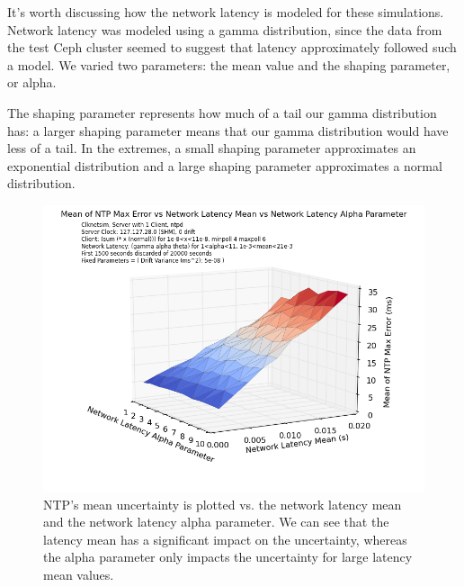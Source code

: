 It's worth discussing how the network latency is modeled for these
simulations. Network latency was modeled using a gamma distribution,
since the data from the test Ceph cluster seemed to suggest that
latency approximately followed such a model. We varied two parameters:
the mean value and the shaping parameter, or alpha.

The shaping parameter represents how much of a tail our gamma
distribution has: a larger shaping parameter means that our gamma
distribution would have less of a tail. In the extremes, a small
shaping parameter approximates an exponential distribution and a large
shaping parameter approximates a normal distribution.


\begin{figure}[h]
  \caption{NTP's mean uncertainty is plotted vs. the network latency mean and the network latency alpha parameter. We can see that the latency mean has a significant impact on the uncertainty, whereas the alpha parameter only impacts the uncertainty for large latency mean values.}
  \label{fig:mean-uncertainty_latency-mean_latency-alpha}
  \includegraphics[width=0.8\linewidth]{mean_max_error-mean_latency-latency_alpha.png}
\end{figure}



